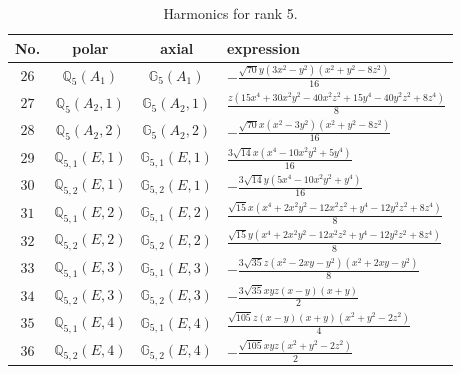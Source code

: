 \documentclass[fleqn,8pt,landscape]{jsarticle}
\begin{document}
\begin{table}[ht!]
\begin{center}
\caption{Harmonics for rank 5.}
\renewcommand{\arraystretch}{1.3}
\begin{tabular}{cccl} \hline \hline
No. & polar & axial & expression \\ \hline
$ 26 $ & $ \mathbb{Q}_{5}(A_{1}) $ & $ \mathbb{G}_{5}(A_{1}) $ & $ - \frac{\sqrt{70} y \left(3 x^{2} - y^{2}\right) \left(x^{2} + y^{2} - 8 z^{2}\right)}{16} $ \\
$ 27 $ & $ \mathbb{Q}_{5}(A_{2},1) $ & $ \mathbb{G}_{5}(A_{2},1) $ & $ \frac{z \left(15 x^{4} + 30 x^{2} y^{2} - 40 x^{2} z^{2} + 15 y^{4} - 40 y^{2} z^{2} + 8 z^{4}\right)}{8} $ \\
$ 28 $ & $ \mathbb{Q}_{5}(A_{2},2) $ & $ \mathbb{G}_{5}(A_{2},2) $ & $ - \frac{\sqrt{70} x \left(x^{2} - 3 y^{2}\right) \left(x^{2} + y^{2} - 8 z^{2}\right)}{16} $ \\
$ 29 $ & $ \mathbb{Q}_{5,1}(E,1) $ & $ \mathbb{G}_{5,1}(E,1) $ & $ \frac{3 \sqrt{14} x \left(x^{4} - 10 x^{2} y^{2} + 5 y^{4}\right)}{16} $ \\
$ 30 $ & $ \mathbb{Q}_{5,2}(E,1) $ & $ \mathbb{G}_{5,2}(E,1) $ & $ - \frac{3 \sqrt{14} y \left(5 x^{4} - 10 x^{2} y^{2} + y^{4}\right)}{16} $ \\
$ 31 $ & $ \mathbb{Q}_{5,1}(E,2) $ & $ \mathbb{G}_{5,1}(E,2) $ & $ \frac{\sqrt{15} x \left(x^{4} + 2 x^{2} y^{2} - 12 x^{2} z^{2} + y^{4} - 12 y^{2} z^{2} + 8 z^{4}\right)}{8} $ \\
$ 32 $ & $ \mathbb{Q}_{5,2}(E,2) $ & $ \mathbb{G}_{5,2}(E,2) $ & $ \frac{\sqrt{15} y \left(x^{4} + 2 x^{2} y^{2} - 12 x^{2} z^{2} + y^{4} - 12 y^{2} z^{2} + 8 z^{4}\right)}{8} $ \\
$ 33 $ & $ \mathbb{Q}_{5,1}(E,3) $ & $ \mathbb{G}_{5,1}(E,3) $ & $ - \frac{3 \sqrt{35} z \left(x^{2} - 2 x y - y^{2}\right) \left(x^{2} + 2 x y - y^{2}\right)}{8} $ \\
$ 34 $ & $ \mathbb{Q}_{5,2}(E,3) $ & $ \mathbb{G}_{5,2}(E,3) $ & $ - \frac{3 \sqrt{35} x y z \left(x - y\right) \left(x + y\right)}{2} $ \\
$ 35 $ & $ \mathbb{Q}_{5,1}(E,4) $ & $ \mathbb{G}_{5,1}(E,4) $ & $ \frac{\sqrt{105} z \left(x - y\right) \left(x + y\right) \left(x^{2} + y^{2} - 2 z^{2}\right)}{4} $ \\
$ 36 $ & $ \mathbb{Q}_{5,2}(E,4) $ & $ \mathbb{G}_{5,2}(E,4) $ & $ - \frac{\sqrt{105} x y z \left(x^{2} + y^{2} - 2 z^{2}\right)}{2} $ \\
 \hline \hline
\end{tabular}
\end{center}
\end{table}
\end{document}
